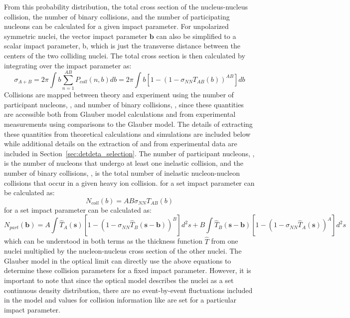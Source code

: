 From this probability distribution, the total cross section of the nucleus-nucleus collision, the number of binary collisions, and the number of participating nucleons can be calculated for a given impact parameter.
For unpolarized symmetric nuclei, the vector impact parameter $\textbf{b}$ can also be simplified to a scalar impact parameter, b, which is just the transverse distance between the centers of the two colliding nuclei.
The total cross section is then calculated by integrating over the impact parameter as:
\begin{equation}
    \sigma_{A+B} = 2 \pi \int b \sum_{n=1}^{AB} P_{coll}(n,b) db = 2 \pi \int b [1 - (1 - \sigma_{NN} T_{AB}(b))^{AB}] db
\end{equation}
Collisions are mapped between theory and experiment using the number of participant nucleons, \Npart, and number of binary collisions, \Ncoll, since these quantities are accessible both from Glauber model calculations and from experimental measurements using comparisons to the Glauber model.
The details of extracting these quantities from theoretical calculations and simulations are included below while additional details on the extraction of \Npart and \Ncoll from experimental data are included in Section~\ref{sec:detdeta_selection}.
The number of participant nucleons, \Npart, is the number of nucleons that undergo at least one inelastic collision, and the number of binary collisions, \Ncoll, is the total number of inelastic nucleon-nucleon collisions that occur in a given heavy ion collision. 
\Ncoll for a set impact parameter can be calculated as:
\begin{equation}
    N_{coll}(b) = AB \sigma_{NN} T_{AB}(b)
\end{equation}
\Npart for a set impact parameter can be calculated as: 
\begin{equation}
    N_{part}(\textbf{b}) = A \int \hat{T}_{A}(\textbf{s}) [1 - (1 - \sigma_{NN} \hat{T}_{B}(\textbf{s}-\textbf{b}))^{B}] d^2s + B \int \hat{T}_{B}(\textbf{s}-\textbf{b}) [1 - (1 - \sigma_{NN} \hat{T}_{A}(\textbf{s}))^{A}] d^2s
\end{equation}
which can be understood in both terms as the thickness function $\hat{T}$ from one nuclei multiplied by the nucleon-nucleus cross section of the other nuclei. 
The Glauber model in the optical limit can directly use the above equations to determine these collision parameters for a fixed impact parameter.
However, it is important to note that since the optical model describes the nuclei as a set continuous density distribution, there are no event-by-event fluctuations included in the model and values for collision information like \Npart are set for a particular impact parameter.

